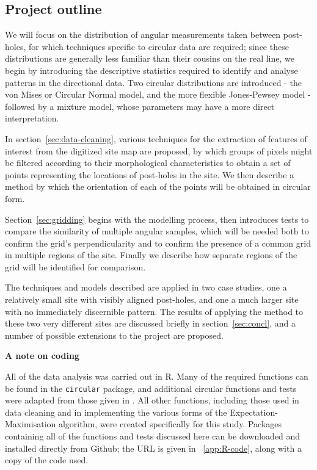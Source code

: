 \documentclass[../../ArchStats.tex]{subfiles}
\begin{document}
\subsection{Project outline}
We will focus on the distribution of angular measurements taken between post-holes, for which techniques specific to circular data are required; since these distributions are generally less familiar than their cousins on the real line, we begin by introducing the descriptive statistics required to identify and analyse patterns in the directional data. Two circular distributions are introduced - the von Mises or Circular Normal model, and the more flexible Jones-Pewsey model - followed by a mixture model, whose parameters may have a more direct interpretation.

In section~\ref{sec:data-cleaning}, various techniques for the extraction of features of interest from the digitized site map are proposed, by which groups of pixels might be filtered according to their morphological characteristics to obtain a set of points representing the locations of post-holes in the site. We then describe a method by which the orientation of each of the points will be obtained in circular form.

Section~\ref{sec:gridding} begins with the modelling process, then introduces tests to compare the similarity of multiple angular samples, which will be needed both to confirm the grid's perpendicularity and to confirm the presence of a common grid in multiple regions of the site. Finally we describe how separate regions of the grid will be identified for comparison.

The techniques and models described are applied in two case studies, one a relatively small site with visibly aligned post-holes, and one a much larger site with no immediately discernible pattern. The results of applying the method to these two very different sites are discussed briefly in section~\ref{sec:concl}, and a number of possible extensions to the project are proposed.


\textbf{A note on coding}

All of the data analysis was carried out in R. Many of the required functions can be found in the \texttt{circular} package, and additional circular functions and tests were adapted from those given in \cite{Pewsey2014}. All other functions, including those used in data cleaning and in implementing the various forms of the Expectation-Maximisation algorithm, were created specifically for this study. Packages containing all of the functions and tests discussed here can be downloaded and installed directly from Github; the URL is given in ~\autoref{app:R-code}, along with a copy of the code used.
\end{document}
